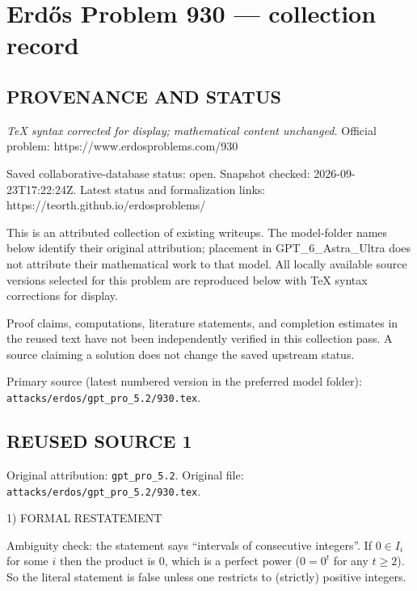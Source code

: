 \section*{Erd\H{o}s Problem 930 --- collection record}

\subsection*{PROVENANCE AND STATUS}

\emph{TeX syntax corrected for display; mathematical content unchanged.}
Official problem: https://www.erdosproblems.com/930

Saved collaborative-database status: open.
Snapshot checked: 2026-09-23T17:22:24Z.
Latest status and formalization links: https://teorth.github.io/erdosproblems/

This is an attributed collection of existing writeups. The model-folder names below identify their original attribution; placement in GPT\_6\_Astra\_Ultra does not attribute their mathematical work to that model. All locally available source versions selected for this problem are reproduced below with TeX syntax corrections for display.

Proof claims, computations, literature statements, and completion estimates in the reused text have not been independently verified in this collection pass. A source claiming a solution does not change the saved upstream status.

Primary source (latest numbered version in the preferred model folder): \texttt{attacks/erdos/gpt\_pro\_5.2/930.tex}.

\subsection*{REUSED SOURCE 1}
Original attribution: \texttt{gpt\_pro\_5.2}.
Original file: \texttt{attacks/erdos/gpt\_pro\_5.2/930.tex}.


1) FORMAL RESTATEMENT

Ambiguity check: the statement says ``intervals of consecutive integers''. If $0\in I_i$ for some $i$ then the product is $0$, which is a perfect power ($0=0^t$ for any $t\ge 2$). So the literal statement is false unless one restricts to (strictly) positive integers.

